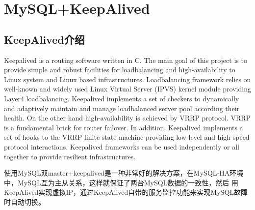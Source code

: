 \chapter{MySQL+KeepAlived}

\section{KeepAlived介绍}
Keepalived is a routing software written in C. The main goal of this
project is to provide simple and robust facilities for loadbalancing
and high-availability to Linux system and Linux based
infrastructures. Loadbalancing framework relies on well-known and
widely used Linux Virtual Server (IPVS) kernel module providing Layer4
loadbalancing. Keepalived implements a set of checkers to dynamically
and adaptively maintain and manage loadbalanced server pool according
their health. On the other hand high-availability is achieved by VRRP
protocol. VRRP is a fundamental brick for router failover. In
addition, Keepalived implements a set of hooks to the VRRP finite
state machine providing low-level and high-speed protocol
interactions. Keepalived frameworks can be used independently or all
together to provide resilient infrastructures.

使用MySQL双master+keepalived是一种非常好的解决方案，在MySQL-HA环境
中，MySQL互为主从关系，这样就保证了两台MySQL数据的一致性，然后
用KeepAlived实现虚拟IP，通过KeepAlived自带的服务监控功能来实现MySQL故障
时自动切换。

